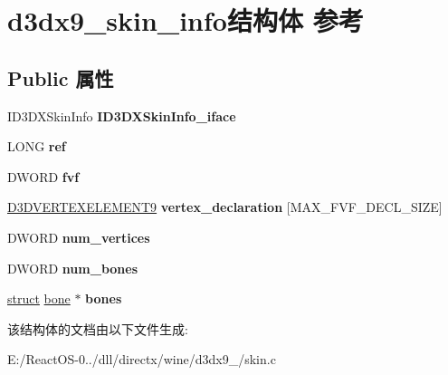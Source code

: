 \hypertarget{structd3dx9__skin__info}{}\section{d3dx9\+\_\+skin\+\_\+info结构体 参考}
\label{structd3dx9__skin__info}
\subsection*{Public 属性}
\begin{DoxyCompactItemize}
\item 
\mbox{\label{structd3dx9__skin__info_a6beaeba9fe6c57f0719b64f7c6de2524}} 
I\+D3\+D\+X\+Skin\+Info {\bfseries I\+D3\+D\+X\+Skin\+Info\+\_\+iface}
\item 
\mbox{\label{structd3dx9__skin__info_aa008f7240cce3eaf0a6f31f5b2db37d8}} 
L\+O\+NG {\bfseries ref}
\item 
\mbox{\label{structd3dx9__skin__info_a9824a7bbfe836991b3ebd3c9c7290da9}} 
D\+W\+O\+RD {\bfseries fvf}
\item 
\mbox{\label{structd3dx9__skin__info_af1e04d1fc201efd2c1fd20f8c1faa7fc}} 
\hyperlink{struct___d3_d_v_e_r_t_e_x_e_l_e_m_e_n_t9}{D3\+D\+V\+E\+R\+T\+E\+X\+E\+L\+E\+M\+E\+N\+T9} {\bfseries vertex\+\_\+declaration} \mbox{[}M\+A\+X\+\_\+\+F\+V\+F\+\_\+\+D\+E\+C\+L\+\_\+\+S\+I\+ZE\mbox{]}
\item 
\mbox{\label{structd3dx9__skin__info_ac5e2df868148c6715d2e1f41fc1b5499}} 
D\+W\+O\+RD {\bfseries num\+\_\+vertices}
\item 
\mbox{\label{structd3dx9__skin__info_afcfde8c965fa740e74c4189bbb19d599}} 
D\+W\+O\+RD {\bfseries num\+\_\+bones}
\item 
\mbox{\label{structd3dx9__skin__info_a30dbd5a6998e24b0fd3f878678662f21}} 
\hyperlink{interfacestruct}{struct} \hyperlink{structbone}{bone} $\ast$ {\bfseries bones}
\end{DoxyCompactItemize}


该结构体的文档由以下文件生成\+:\begin{DoxyCompactItemize}
\item 
E\+:/\+React\+O\+S-\/0../dll/directx/wine/d3dx9\+\_/skin.\+c\end{DoxyCompactItemize}
